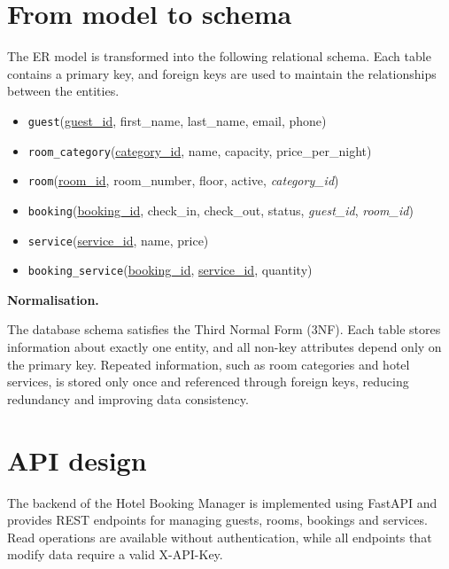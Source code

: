 \documentclass[11pt,a4paper]{article}
\begin{document}
\section{From model to schema}

The ER model is transformed into the following relational schema. Each table
contains a primary key, and foreign keys are used to maintain the relationships
between the entities.

\begin{itemize}

\item \texttt{guest}(\underline{guest\_id}, first\_name, last\_name, email, phone)

\item \texttt{room\_category}(\underline{category\_id}, name, capacity, price\_per\_night)

\item \texttt{room}(\underline{room\_id}, room\_number, floor, active,
\emph{category\_id})

\item \texttt{booking}(\underline{booking\_id}, check\_in, check\_out,
status, \emph{guest\_id}, \emph{room\_id})

\item \texttt{service}(\underline{service\_id}, name, price)

\item \texttt{booking\_service}(\underline{booking\_id},
\underline{service\_id}, quantity)

\end{itemize}

\textbf{Normalisation.}

The database schema satisfies the Third Normal Form (3NF). Each table stores
information about exactly one entity, and all non-key attributes depend only on
the primary key. Repeated information, such as room categories and hotel
services, is stored only once and referenced through foreign keys, reducing
redundancy and improving data consistency.
\section{API design}

The backend of the Hotel Booking Manager is implemented using FastAPI and
provides REST endpoints for managing guests, rooms, bookings and services.
Read operations are available without authentication, while all endpoints that
modify data require a valid X-API-Key.
\end{document}
